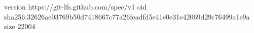 version https://git-lfs.github.com/spec/v1
oid sha256:32626ae03769b50d7418667c77a26feadfd5e41e0e31e42069d29c76499a1e9a
size 22004
